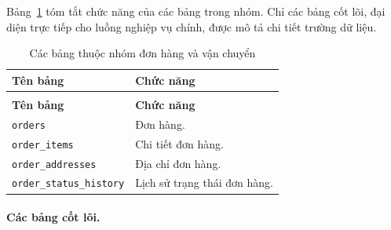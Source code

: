 Bảng~\ref{tab:data-summary-order-shipping} tóm tắt chức năng của các bảng trong nhóm. Chỉ các bảng cốt lõi, đại diện trực tiếp cho luồng nghiệp vụ chính, được mô tả chi tiết trường dữ liệu.

\begin{longtable}{|>{\RaggedRight\arraybackslash}p{}|>{\RaggedRight\arraybackslash}p{}|}
    \caption{Các bảng thuộc nhóm đơn hàng và vận chuyển}
    \label{tab:data-summary-order-shipping} \\
    \hline
    \textbf{Tên bảng} & \textbf{Chức năng} \\
    \hline
    \endfirsthead
    \multicolumn{2}{c}{\tablename\ \thetable\ (tiếp theo)} \\
    \hline
    \textbf{Tên bảng} & \textbf{Chức năng} \\
    \hline
    \endhead
    \texttt{orders} & Đơn hàng. \\
    \hline
    \texttt{order\_items} & Chi tiết đơn hàng. \\
    \hline
    \texttt{order\_addresses} & Địa chỉ đơn hàng. \\
    \hline
    \texttt{order\_status\_history} & Lịch sử trạng thái đơn hàng. \\
    \hline
\end{longtable}

\paragraph{Các bảng cốt lõi.}

